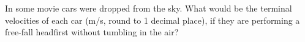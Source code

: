 
In some movie cars were dropped from the sky.
What would be the terminal velocities of each car (m/s, round to 1 decimal place), if they are
performing a free-fall headfirst without tumbling in the air?
